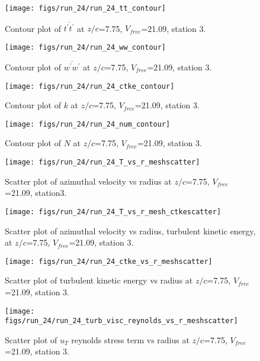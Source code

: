 \begin{figure}[H]
\centering
\texttt{[image: figs/run\_24/run\_24\_tt\_contour]}
\caption{Contour plot of $\overline{t^\prime t^\prime}$ at $z/c$=7.75, $V_{free}$=21.09, station 3.}
\end{figure}


\begin{figure}[H]
\centering
\texttt{[image: figs/run\_24/run\_24\_ww\_contour]}
\caption{Contour plot of $\overline{w^\prime w^\prime}$ at $z/c$=7.75, $V_{free}$=21.09, station 3.}
\end{figure}


\begin{figure}[H]
\centering
\texttt{[image: figs/run\_24/run\_24\_ctke\_contour]}
\caption{Contour plot of $k$ at $z/c$=7.75, $V_{free}$=21.09, station 3.}
\end{figure}


\begin{figure}[H]
\centering
\texttt{[image: figs/run\_24/run\_24\_num\_contour]}
\caption{Contour plot of $N$ at $z/c$=7.75, $V_{free}$=21.09, station 3.}
\end{figure}


\begin{figure}[H]
\centering
\texttt{[image: figs/run\_24/run\_24\_T\_vs\_r\_meshscatter]}
\caption{Scatter plot of azimuthal velocity vs radius at $z/c$=7.75, $V_{free}$=21.09, station3.}
\end{figure}


\begin{figure}[H]
\centering
\texttt{[image: figs/run\_24/run\_24\_T\_vs\_r\_mesh\_ctkescatter]}
\caption{Scatter plot of azimuthal velocity vs radius, turbulent kinetic energy, at $z/c$=7.75, $V_{free}$=21.09, station 3.}
\end{figure}


\begin{figure}[H]
\centering
\texttt{[image: figs/run\_24/run\_24\_ctke\_vs\_r\_meshscatter]}
\caption{Scatter plot of turbulent kinetic energy vs radius at $z/c$=7.75, $V_{free}$=21.09, station 3.}
\end{figure}


\begin{figure}[H]
\centering
\texttt{[image: figs/run\_24/run\_24\_turb\_visc\_reynolds\_vs\_r\_meshscatter]}
\caption{Scatter plot of $
u_T$ reynolds stress term vs radius at $z/c$=7.75, $V_{free}$=21.09, station 3.}
\end{figure}


